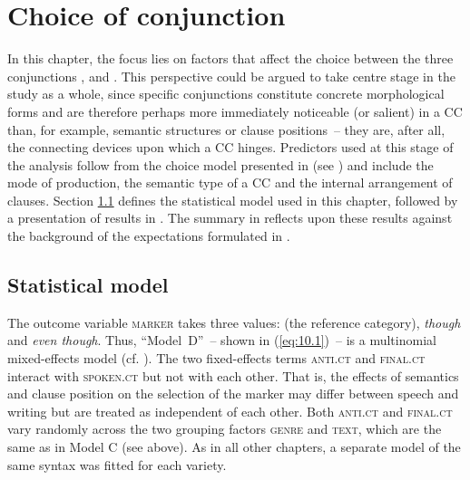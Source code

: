 \chapter{Choice of conjunction}\label{bkm:Ref34987799}\label{ch:10}\label{sec:10}

In this chapter, the focus lies on factors that affect the choice between the three conjunctions ,  and . This perspective could be argued to take centre stage in the study as a whole, since specific conjunctions constitute concrete morphological forms and are therefore perhaps more immediately noticeable (or salient) in a CC than, for example, semantic structures or clause positions~– they are, after all, the connecting devices upon which a CC hinges. Predictors used at this stage of the analysis follow from the choice model presented in  (see ) and include the mode of production, the semantic type of a CC and the internal arrangement of clauses. Section \ref{sec:10.1} defines the statistical model used in this chapter, followed by a presentation of results in . The summary in  reflects upon these results against the background of the expectations formulated in .

\section{\label{bkm:Ref59515395}Statistical model}\label{sec:10.1}

The outcome variable \textsc{marker} takes three values:  (the reference category), \textit{though} and \textit{even though}. Thus, “Model~D”~– shown in (\ref{eq:10.1})~– is a multinomial mixed-effects model (cf. ). The two fixed-effects terms \textsc{anti.ct} and \textsc{final.ct} interact with \textsc{spoken.ct} but not with each other. That is, the effects of semantics and clause position on the selection of the marker may differ between speech and writing but are treated as independent of each other. Both \textsc{anti.ct} and \textsc{final.ct} vary randomly across the two grouping factors \textsc{genre} and \textsc{text}, which are the same as in Model C (see  above). As in all other chapters, a separate model of the same syntax was fitted for each variety.

